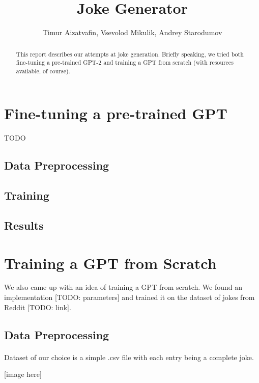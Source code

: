 \documentclass[12pt]{article}
\begin{document}
\title{Joke Generator}
\author{Timur Aizatvafin, Vsevolod Mikulik, Andrey Starodumov}

\maketitle

\begin{abstract}
	This report describes our attempts at joke generation. Briefly speaking, we tried both fine-tuning a pre-trained GPT-2 and
    training a GPT from scratch (with resources available, of course).
\end{abstract}

\section{Fine-tuning a pre-trained GPT}
	TODO

\subsection{Data Preprocessing}

\subsection{Training}

\subsection{Results}

\section{Training a GPT from Scratch}

We also came up with an idea of training a GPT from scratch. We found an implementation [TODO: parameters] and trained it on the dataset
of jokes from Reddit [TODO: link].

\subsection{Data Preprocessing}

\paragraph{}
Dataset of our choice is a simple .csv file with each entry being a complete joke.

[image here]
\end{document}
